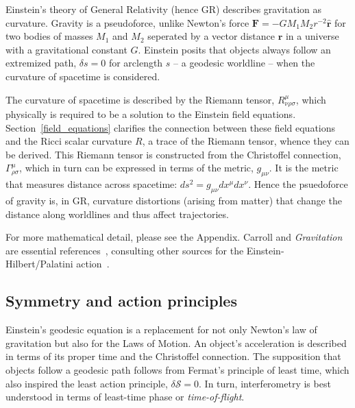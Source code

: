         Einstein's theory of General Relativity (hence GR) describes gravitation as curvature. 
Gravity is a pseudoforce, unlike Newton's force $\textbf{F} = -G M_1 M_2 r^{-2} \hat{\textbf{r}}$ for two bodies of masses $M_1$ and $M_2$ seperated by a vector distance $\textbf{r}$ in a universe with a gravitational constant $G$.
 Einstein posits that objects always follow an extremized path, $\delta s = 0$ for arclength $s$  -- a geodesic worldline -- when the curvature of spacetime is considered. 

The curvature of spacetime is described by the Riemann tensor, $R^\mu_{\nu\rho\sigma}$, which physically is required to be a solution to the Einstein field equations. 
Section~\ref{field_equations} clarifies the connection between these field equations and the Ricci scalar curvature $R$, a trace of the Riemann tensor, whence they can be derived. 
This Riemann tensor is constructed from the Christoffel connection, $\Gamma^\mu_{\rho\sigma}$, which in turn can be expressed in terms of the metric, $g_{\mu \nu}$.
It is the metric that measures distance across spacetime: $ds^2 = g_{\mu\nu} dx^\mu dx^\nu$.
Hence the psuedoforce of gravity is, in GR, curvature distortions (arising from matter) that change the distance along worldlines and thus affect trajectories.

For more mathematical detail, please see the Appendix.
 Carroll and \textit{Gravitation} are essential references~\cite{Carroll1997,MisnerThorneWheeler}, consulting other sources for the Einstein-Hilbert/Palatini action~\cite{FarrThesis}.


        \subsection{Symmetry and action principles}
        \label{principles}

Einstein's geodesic equation is a replacement for not only Newton's law of gravitation but also for the Laws of Motion.
An object's acceleration is described in terms of its proper time and the Christoffel connection.
The supposition that objects follow a geodesic path follows from Fermat's principle of least time, which also inspired the least action principle, $\delta \mathcal{S} = 0$.
In turn, interferometry is best understood in terms of least-time phase or \textit{time-of-flight}.

